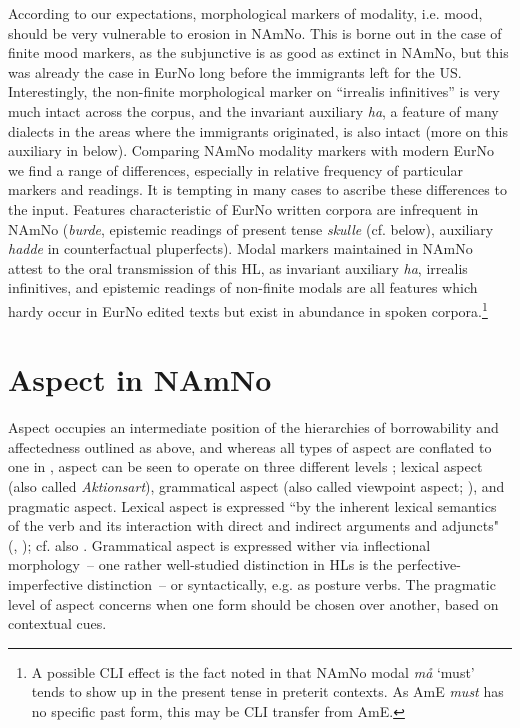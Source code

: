 \documentclass[output=paper]{langscibook}
\begin{document}
According to our expectations, morphological markers of modality, i.e. mood, should be very vulnerable to erosion in NAmNo. This is borne out in the case of finite mood markers, as the subjunctive is as good as extinct in NAmNo, but this was already the case in EurNo long before the immigrants left for the US. Interestingly, the non-finite morphological marker on “irrealis infinitives” is very much intact across the corpus, and the invariant auxiliary \textit{ha}, a feature of many dialects in the areas where the immigrants originated, is also intact (more on this auxiliary in  below). Comparing NAmNo modality markers with modern EurNo we find a range of differences, especially in relative frequency of particular markers and readings. It is tempting in many cases to ascribe these differences to the input. Features characteristic of EurNo written corpora are infrequent in NAmNo (\textit{burde}, epistemic readings of present tense \textit{skulle} (cf.  below), auxiliary \textit{hadde} in counterfactual pluperfects). Modal markers maintained in NAmNo attest to the oral transmission of this HL, as invariant auxiliary \textit{ha}, irrealis infinitives, and epistemic readings of non-finite modals are all features which hardy occur in EurNo edited texts but exist in abundance in spoken corpora.\footnote{A possible CLI effect is the fact noted in \citet{Lykke2022} that NAmNo modal \textit{må} ‘must’ tends to show up in the present tense in preterit contexts. As AmE \textit{must} has no specific past form, this may be CLI transfer from AmE.}  

\section{Aspect in NAmNo}
\label{sec:eide:4}

Aspect occupies an intermediate position of the hierarchies of borrowability and affectedness outlined as  above, and whereas all types of aspect are conflated to one in , aspect can be seen to operate on three different levels \citep{Laleko2010}; lexical aspect (also called \textit{Aktionsart}), grammatical aspect (also called viewpoint aspect; \citealt{Smith1991}), and pragmatic aspect. Lexical aspect is expressed “by the inherent lexical semantics of the verb and its interaction with direct and indirect arguments and adjuncts" (\citealt{Dowty1986}, \citealt{Verkuyl1994}); cf. also \citet[63]{Montrul2016}. Grammatical aspect is expressed wither via inflectional morphology~– one rather well-studied distinction in HLs is the perfective-imperfective distinction~– or syntactically, e.g. as posture verbs. The pragmatic level of aspect concerns when one form should be chosen over another, based on contextual cues. 
\end{document}
